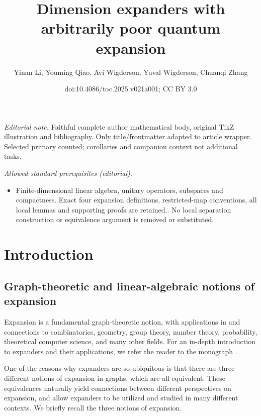 \documentclass[11pt]{article}
\title{Dimension expanders with arbitrarily poor quantum expansion}
\author{Yinan Li, Youming Qiao, Avi Wigderson, Yuval Wigderson, Chuanqi Zhang}
\date{doi:10.4086/toc.2025.v021a001; CC BY 3.0}
\theoremstyle{plain}
\numberwithin{equation}{section}
\theoremstyle{definition}
\begin{document}
\maketitle
\noindent\textit{Editorial note.} Faithful complete author mathematical body, original TikZ illustration and bibliography. Only title/frontmatter adapted to article wrapper. Selected primary counted; corollaries and companion context not additional tasks.\par\medskip
\noindent\textit{Allowed standard prerequisites (editorial).}\begin{itemize}
\item Finite-dimensional linear algebra, unitary operators, subspaces and compactness. Exact four expansion definitions, restricted-map conventions, all local lemmas and supporting proofs are retained.. No local separation construction or equivalence argument is removed or substituted.
\end{itemize}\medskip
\section{Introduction}
\subsection{Graph-theoretic and linear-algebraic notions of expansion}\label{subsec:overview}

Expansion is a fundamental graph-theoretic notion, with applications in and connections to combinatorics, geometry, group theory, number theory, probability, theoretical computer science, and many other fields. For an in-depth introduction to expanders and their applications, we refer the reader to the monograph \cite{HLW06}.

One of the reasons why expanders are so ubiquitous is that there are three different notions of expansion in graphs, which are all equivalent. These equivalences naturally yield connections between different perspectives on expansion, and allow expanders to be utilized and studied in many different contexts. We briefly recall the three notions of expansion.
\end{document}
